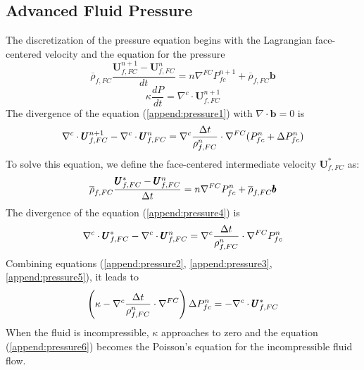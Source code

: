 \documentclass[preprint,12pt]{elsarticle}
\begin{document}
\subsection{\textsf{Advanced Fluid Pressure}}
The discretization of the pressure equation begins with the Lagrangian face-centered velocity and the equation for the pressure
%
\begin{equation}
 \label{append:pressure1}
  \overline{\rho}_{f,FC} \frac{\pmb{U}_{f,FC}^{n+1} - \pmb{U}_{f,FC}^{n}}{dt} 
  = n \nabla^{FC} P_{fc}^{n+1} + \overline{\rho}_{f,FC} \pmb{b}
\end {equation}
%
%
\begin{equation}
\label{append:pressure2}
  \kappa \frac{dP}{dt} = \nabla^c \cdot \pmb{U}_{f,FC}^{n+1}
\end {equation}
%
The divergence of the equation (\ref{append:pressure1}) with $ \nabla \cdot \pmb{b} = 0$ is
%
\begin{equation}
\label{append:pressure3}
  \nabla^c \cdot \pmb{U}_{f,FC}^{n+1} - \nabla^c \cdot \pmb{U}_{f,FC}^{n}
  = \nabla^c \frac{\Delta{t}}{\rho_{f,FC}^n} \cdot \nabla^{FC} (P_{fc}^{n} + \Delta P_{fc}^{n})
\end {equation}
%
To solve this equation, we define the face-centered intermediate velocity $ \pmb{U}_{f,FC}^{*}$ as:
%
\begin{equation}
 \label{append:pressure4}
  \overline{\rho}_{f,FC} \frac{\pmb{U}_{f,FC}^{*} - \pmb{U}_{f,FC}^{n}}{\Delta{t}} 
  = n \nabla^{FC} P_{fc}^{n} + \overline{\rho}_{f,FC} \pmb{b}
\end {equation}
%
%
The divergence of the equation (\ref{append:pressure4}) is
%
\begin{equation}
\label{append:pressure5}
  \nabla^c \cdot \pmb{U}_{f,FC}^{*} - \nabla^c \cdot \pmb{U}_{f,FC}^{n}
  = \nabla^c \frac{\Delta{t}}{\rho_{f,FC}^n} \cdot \nabla^{FC} P_{fc}^{n}
\end {equation}
%
Combining equations (\ref{append:pressure2}, \ref{append:pressure3}, \ref{append:pressure5}), it leads to
\begin{equation}
\label{append:pressure6}
  \left(  
   \kappa - \nabla^c \frac{\Delta{t}}{\rho_{f,FC}^n} \cdot \nabla^{FC}
  \right) \Delta P_{fc}^{n} = - \nabla^c \cdot \pmb{U}_{f,FC}^{*}
\end {equation}
When the fluid is incompressible, $\kappa$ approaches to zero and the equation (\ref{append:pressure6}) becomes the Poisson's equation for the incompressible fluid flow.
%
%
\end{document}
